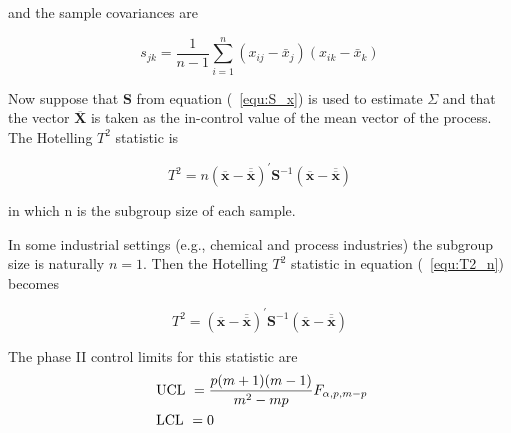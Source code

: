 and the sample covariances are

\begin{equation}
s_{j k}=\frac{1}{n-1} \sum_{i=1}^{n}\left(x_{i j}-\bar{x}_{j}\right)\left(x_{i k}-\bar{x}_{k}\right)
\label{equ:S_ij}
\end{equation}

Now suppose that $\mathbf{S}$ from equation (~\ref{equ:S_x}) is used to estimate
$\Sigma$ and that the vector ${\overline{\mathbf{X}}}$ is taken as the in-control value of the mean vector of the process. The Hotelling $T^{2}$ statistic is

\begin{equation}
T^{2}=n(\overline{\mathbf{x}}-\overline{\overline{\mathbf{x}}})^{\prime} \mathbf{S}^{-1}(\overline{\mathbf{x}}-\overline{\overline{\mathbf{x}}})
\label{equ:T2_n}
\end{equation}

in which n is the subgroup size of each sample.

In some industrial settings (e.g., chemical and process industries) the subgroup size is naturally $n = 1$. Then the Hotelling $T^{2}$ statistic in equation
(~\ref{equ:T2_n}) becomes

\begin{equation}
T^{2}=(\overline{\mathbf{x}}-\overline{\overline{\mathbf{x}}})^{\prime} \mathbf{S}^{-1}(\overline{\mathbf{x}}-\overline{\overline{\mathbf{x}}})
\label{equ:T2}
\end{equation}

The phase II control limits for this statistic are
\begin{equation}
\begin{aligned}
\centering&\text { UCL }=\frac{p(m+1)(m-1)}{m^{2}-m p} F_{\alpha, p, m-p} \\
\centering&\text { LCL }=0
\end{aligned}
\end{equation}









































